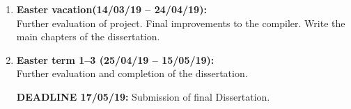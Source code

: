 \documentclass[12pt,a4paper,twoside]{article}
\begin{document}
\begin{enumerate}
\item \textbf{Easter vacation(14/03/19 -- 24/04/19):} \\
Further evaluation of project. Final improvements to the compiler.
Write the main chapters of the dissertation.

\item \textbf{Easter term 1--3 (25/04/19 -- 15/05/19):}  \\
Further evaluation and completion of the dissertation.

\textbf{DEADLINE 17/05/19:} Submission of final Dissertation. \\

\end{enumerate}
\end{document}
